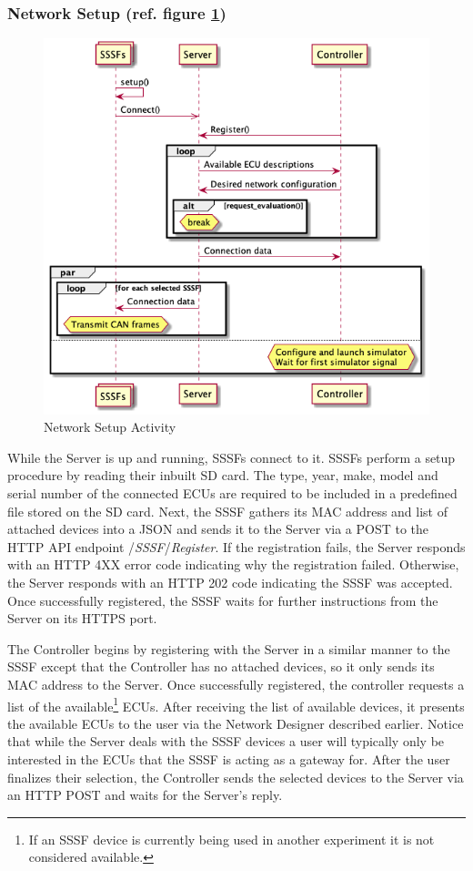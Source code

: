 \documentclass[letterpaper,twocolumn,12pt]{article}
\begin{document}
\subsubsection{Network Setup (ref. figure \ref{fig:setup_activity})}
\begin{figure}[]
    \centering
    \includegraphics[scale=0.8]{out/images/connection_setup/connection_setup.png}
    \caption{Network Setup Activity}
    \label{fig:setup_activity}
\end{figure}
While the Server is up and running, SSSFs connect to it. SSSFs perform a setup procedure by reading their inbuilt SD card. The type, year, make, model and serial number of the connected ECUs are required to be included in a predefined file stored on the SD card. Next, the SSSF gathers its MAC address and list of attached devices into a JSON and sends it to the Server via a POST to the HTTP API endpoint /\textit{SSSF}/\textit{Register}. 
If the registration fails, the Server responds with an HTTP 4XX error code indicating why the registration failed. Otherwise, the Server responds with an HTTP 202 code indicating the SSSF was accepted. Once successfully registered, the SSSF waits for further instructions from the Server on its HTTPS port. 

The Controller begins by registering with the Server in a similar manner to the SSSF except that the Controller has no attached devices, so it only sends its MAC address to the Server.
Once successfully registered, the controller requests a list of the available{\footnote{If an SSSF device is currently being used in another experiment it is not considered available.}} ECUs. After receiving the list of available devices, it presents the available ECUs to the user via the Network Designer described earlier. Notice that while the Server deals with the SSSF devices a user will typically only be interested in the ECUs that the SSSF is acting as a gateway for. After the user finalizes their selection, the Controller sends the selected devices to the Server via an HTTP POST and waits for the Server's reply.
\end{document}
